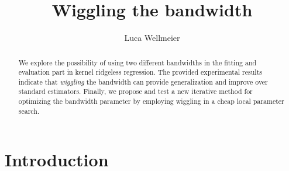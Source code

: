 \documentclass[12pt]{amsart}
\title{Wiggling the bandwidth}
\author{Luca Wellmeier}
\begin{document}
\begin{abstract}
    We explore the possibility of using two different bandwidths in the 
    fitting and evaluation part in kernel ridgeless regression.
    The provided experimental results indicate that \textit{wiggling}
    the bandwidth can provide generalization and improve over standard
    estimators.
    Finally, we propose and test a new iterative method for optimizing the 
    bandwidth parameter by employing wiggling in a cheap local parameter 
    search.
\end{abstract}
\maketitle
\tableofcontents

\section{Introduction}
\end{document}

